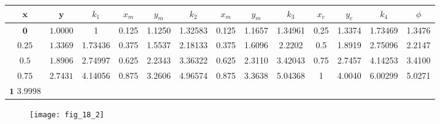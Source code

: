 \documentclass[../main.tex]{subfiles}
\begin{document}
\begin{enumerate}[label=\bfseries(\alph*)]
\begin{tabular}{ccccccccccccc}
\hline
$\boldsymbol{x}$ & $\boldsymbol{y}$ & $k_{1}$ & $x_{m}$ & $y_{m}$ & $k_{2}$ & $x_{m}$ & $y_{m}$ & $k_{3}$ & $x_{e}$ & $y_{e}$ & $k_{4}$ & $\phi$\\
\hline
$\mathbf{0}$&$\mathbf{1.0000}$&1&0.125&1.1250&1.32583&0.125&1.1657&1.34961&0.25&1.3374&1.73469&1.3476\\
$\mathbf{0.25}$&$\mathbf{1.3369}$&1.73436&0.375&1.5537&2.18133&0.375&1.6096&2.2202&0.5&1.8919&2.75096&2.2147\\
$\mathbf{0.5}$&$\mathbf{1.8906}$&2.74997&0.625&2.2343&3.36322&0.625&2.3110&3.42043&0.75&2.7457&4.14253&3.4100\\
$\mathbf{0.75}$&$\mathbf{2.7431}$&4.14056&0.875&3.2606&4.96574&0.875&3.3638&5.04368&1&4.0040&6.00299&5.0271\\
 $\mathbf{1}$  $\mathbf{3.9998}$ &  &  &  &  &  &  &  &  &  &  & \\
\hline
\end{tabular}
	\bigbreak
	\begin{figure}[H]
		\texttt{[image: fig\_18\_2]}
		\label{fig:fig_18_2}
	\end{figure}
\end{enumerate}
\end{document}
